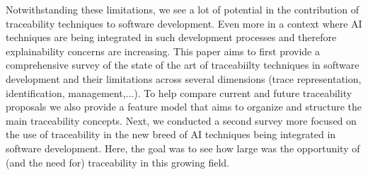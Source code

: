 






Notwithstanding these limitations, we see a lot of potential in the contribution of traceability techniques to software development. Even more in a context where AI techniques are being integrated in such development processes and therefore explainability concerns are increasing. This paper aims to first provide a comprehensive survey of the state of the art of traceabiilty techniques in software development and their limitations across several dimensions (trace representation, identification, management,...). To help compare current and future traceability proposals we also provide a feature model that aims to organize and structure the main traceability concepts. Next, we conducted a second survey more focused on the use of traceability in the new breed of AI techniques being integrated in software development. Here, the goal was to see how large was the opportunity of (and the need for) traceability in this growing field. 






